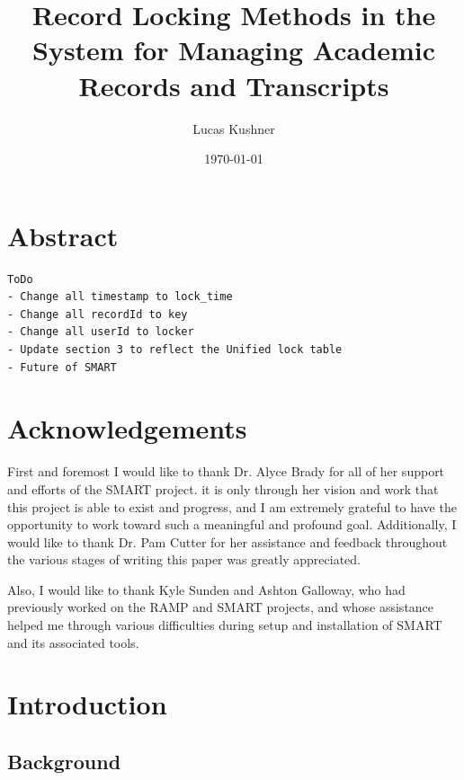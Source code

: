 \documentclass[12pt]{article}
\title{Record Locking Methods in the System for Managing Academic Records and Transcripts}
\author{Lucas Kushner}
\date{\today}
\begin{document}
\begin{titlepage}
    \maketitle
    \thispagestyle{empty}
\end{titlepage}

\newpage\null\thispagestyle{empty}\newpage

\doublespace

\section*{Abstract}
\begin{verbatim}
ToDo
- Change all timestamp to lock_time
- Change all recordId to key
- Change all userId to locker
- Update section 3 to reflect the Unified lock table
- Future of SMART
\end{verbatim}

\newpage

\section*{Acknowledgements}
First and foremost I would like to thank Dr. Alyce Brady for all of her support and efforts of the SMART project. it is only through her vision and work that this project is able to exist and progress, and I am extremely grateful to have the opportunity to work toward such a meaningful and profound goal. Additionally, I would like to thank Dr. Pam Cutter for her assistance and feedback throughout the various stages of writing this paper was greatly appreciated.

Also, I would like to thank Kyle Sunden and Ashton Galloway, who had previously worked on the RAMP and SMART projects, and whose assistance helped me through various difficulties during setup and installation of SMART and its associated tools.

\newpage

\tableofcontents

\newpage
{}
\section{Introduction}

\subsection{Background}
\end{document}
